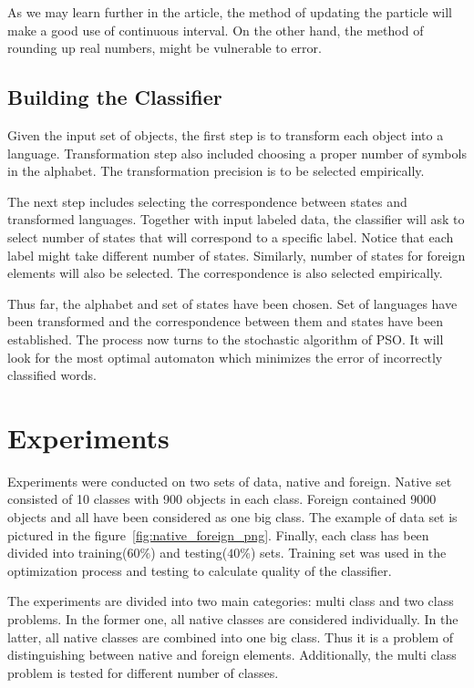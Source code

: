\documentclass{mini}
\begin{document}
As we may learn further in the article, the method of updating the particle will make a good use of continuous interval. On the other hand, the method of rounding up real numbers, might be vulnerable to error.

\section{Building the Classifier}\label{sec:classification_transf_step}
Given the input set of objects, the first step is to transform each object into a language. Transformation step also included choosing a proper number of symbols in the alphabet. The transformation precision is to be selected empirically.

The next step includes selecting the correspondence between states and transformed languages. Together with input labeled data, the classifier will ask to select number of states that will correspond to a specific label. Notice that each label might take different number of states. Similarly, number of states for foreign elements will also be selected. The correspondence is also selected empirically.

Thus far, the alphabet and set of states have been chosen. Set of languages have been transformed and the correspondence between them and states have been established. The process now turns to the stochastic algorithm of PSO. It will look for the most optimal automaton which minimizes the error of incorrectly classified words.


\chapter{Experiments}\label{chap:experiments}

Experiments were conducted on two sets of data, native and foreign. Native set consisted of 10 classes with 900 objects in each class. Foreign contained 9000 objects and all have been considered as one big class. The example of data set is pictured in the figure~\ref{fig:native_foreign_png}. Finally, each class has been divided into training($60\%$) and testing($40\%$) sets. Training set was used in the optimization process and testing to calculate quality of the classifier.

The experiments are divided into two main categories: multi class and two class problems. In the former one, all native classes are considered individually. In the latter, all native classes are combined into one big class. Thus it is a problem of distinguishing between native and foreign elements. Additionally, the multi class problem is tested for different number of classes.
\end{document}

